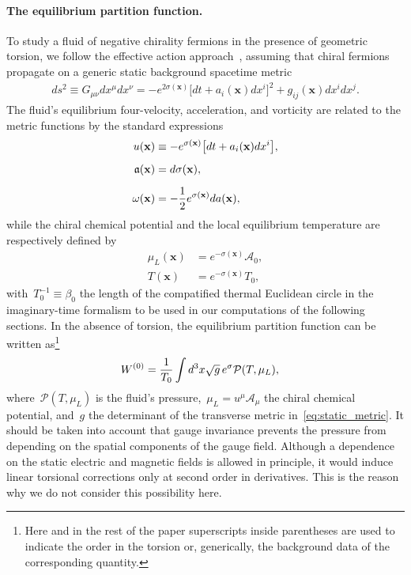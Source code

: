 \documentclass[11pt,a4paper]{article}
\begin{document}
\paragraph{The equilibrium partition function.}
To study a fluid of negative chirality fermions in the presence of geometric
torsion, we follow the effective action 
approach~\cite{Banerjee:2012iz,Jensen:2012jh}, assuming that
chiral fermions propagate 
on a generic static background spacetime metric
\begin{align}
ds^{2}\equiv G_{\mu\nu}dx^{\mu}dx^{\nu}
=-e^{2\sigma(\mathbf{x})}\big[dt+a_{i}(\mathbf{x})dx^{i}\big]^{2}+g_{ij}(\mathbf{x})dx^{i}dx^{j}.
\label{eq:static_metric}
\end{align} 
The fluid's equilibrium four-velocity, acceleration, and vorticity are related 
to the metric functions by the standard expressions
\begin{align}
u(\mathbf{x})&\equiv -e^{\sigma(\mathbf{x})}\big[dt+a_{i}(\mathbf{x})dx^{i}\big], \nonumber \\[0.2cm]
\mathfrak{a}(\mathbf{x})&=d\sigma(\mathbf{x}), \label{eq:uaomega}\\[0.2cm]
\omega(\mathbf{x})&=-{1\over 2}e^{\sigma(\mathbf{x})}da(\mathbf{x}),
\nonumber
\end{align}
while the chiral chemical potential and 
the local equilibrium temperature are respectively defined
by
\begin{align}
\mu_{L}(\mathbf{x})&=e^{-\sigma(\mathbf{x})}\mathcal{A}_{0},\nonumber \\[0.2cm] 
T(\mathbf{x})&=e^{-\sigma(\mathbf{x})}T_{0},
\label{eq:muLT0defs}
\end{align} 
with~$T_{0}^{-1}\equiv \beta_{0}$ the length of the compatified thermal Euclidean circle
in the imaginary-time formalism to be used in our computations of the following sections. 
In the absence of torsion, the equilibrium partition function can be written
as\footnote{Here and in the rest of the paper 
superscripts inside parentheses are used to 
indicate the order in the torsion or, generically, the background data
of the corresponding quantity.}
\begin{align}
W^{(0)}&={1\over T_{0}}\int d^{3}x\sqrt{g}\,e^{\sigma}\mathcal{P}(T,\mu_{L}),
\label{eq:W0der}
\end{align}
where~$\mathcal{P}(T,\mu_{L})$ is the fluid's 
pressure,~$\mu_{L}=u^{\mu}\mathcal{A}_{\mu}$ the chiral chemical potential,
and~$g$ the determinant of the
transverse metric in~\eqref{eq:static_metric}. It should be taken into account that gauge invariance
prevents the pressure from depending on the spatial components of the gauge field.
Although a dependence on the static electric and magnetic fields is allowed in principle, it would induce 
linear torsional corrections only at second order in derivatives. This is the reason why we
do not consider this possibility here. 
\end{document}
